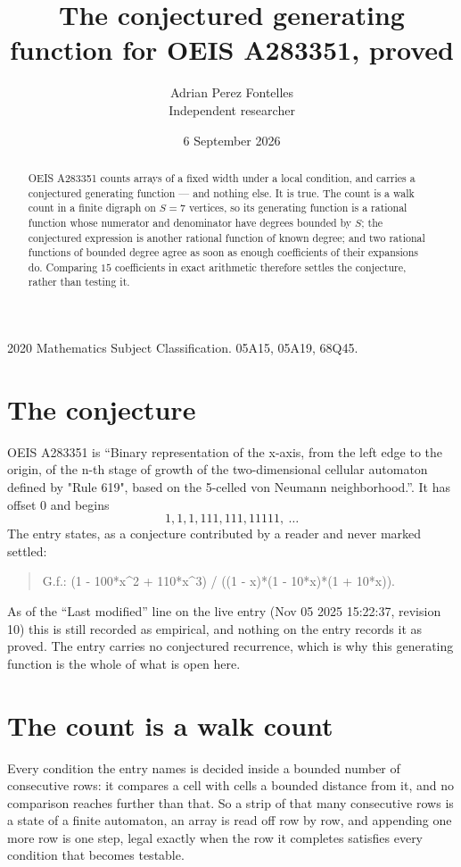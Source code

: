 \documentclass[11pt,a4paper]{article}
\title{The conjectured generating function for OEIS A283351, proved}
\author{Adrian Perez Fontelles\\ \small Independent researcher}
\date{6 September 2026}
\theoremstyle{plain}
\theoremstyle{definition}
\begin{document}
\maketitle

\begin{abstract}
OEIS A283351 counts arrays of a fixed width under a local condition, and carries a conjectured
generating function --- and nothing else. It is true. The count is a walk count in a finite
digraph on $S=7$ vertices, so its generating function is a rational function whose numerator
and denominator have degrees bounded by $S$; the conjectured expression is another rational
function of known degree; and two rational functions of bounded degree agree as soon as enough
coefficients of their expansions do. Comparing $15$ coefficients in exact arithmetic
therefore settles the conjecture, rather than testing it.
\end{abstract}

\noindent\small 2020 Mathematics Subject Classification. 05A15, 05A19, 68Q45.\normalsize

\section{The conjecture}

OEIS A283351 is ``Binary representation of the x-axis, from the left edge to the origin, of the n-th stage of growth of the two-dimensional cellular automaton defined by "Rule 619", based on the 5-celled von Neumann neighborhood.''. It has offset $0$ and begins
\[
1, 1, 1, 111, 111, 11111,\ \dots
\]
The entry states, as a conjecture contributed by a reader and never marked settled:
\begin{quote}
G.f.: (1 - 100*x\^{}2 + 110*x\^{}3) / ((1 - x)*(1 - 10*x)*(1 + 10*x)).
\end{quote}
As of the ``Last modified'' line on the live entry (Nov 05 2025 15:22:37, revision 10) this is still
recorded as empirical, and nothing on the entry records it as proved. The entry carries no
conjectured recurrence, which is why this generating function is the whole of what is open
here.

\section{The count is a walk count}

Every condition the entry names is decided inside a bounded number of consecutive rows: it
compares a cell with cells a bounded distance from it, and no comparison reaches further than
that. So a strip of that many consecutive rows is a state of a finite automaton, an array is
read off row by row, and appending one more row is one step, legal exactly when the row it
completes satisfies every condition that becomes testable.
\end{document}
